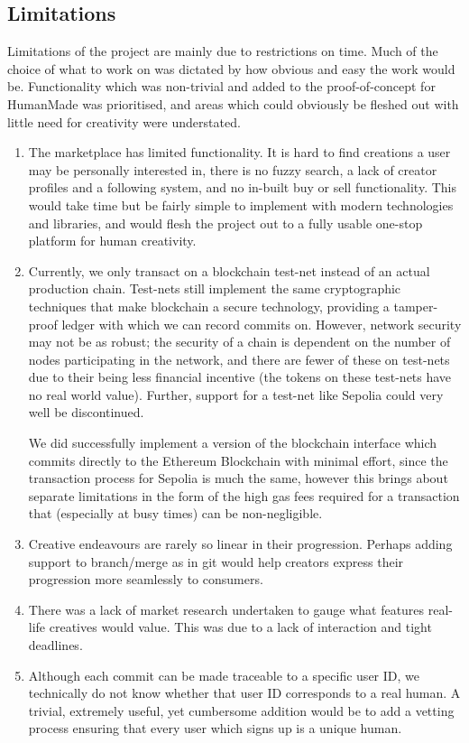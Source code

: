 \documentclass[12pt,a4paper]{article}
\begin{document}
\subsection{Limitations}
Limitations of the project are mainly due to restrictions on time. Much of the choice of what to work on was dictated by how obvious and easy the work would be. Functionality which was non-trivial and added to the proof-of-concept for HumanMade was prioritised, and areas which could obviously be fleshed out with little need for creativity were understated.
\begin{enumerate}
    \item The marketplace has limited functionality. It is hard to find creations a user may be personally interested in, there is no fuzzy search, a lack of creator profiles and a following system, and no in-built buy or sell functionality. This would take time but be fairly simple to implement with modern technologies and libraries, and would flesh the project out to a fully usable one-stop platform for human creativity.
    \item Currently, we only transact on a blockchain test-net instead of an actual production chain. Test-nets still implement the same cryptographic techniques that make blockchain a secure technology, providing a tamper-proof ledger with which we can record commits on. However, network security may not be as robust; the security of a chain is dependent on the number of nodes participating in the network, and there are fewer of these on test-nets due to their being less financial incentive (the tokens on these test-nets have no real world value). Further, support for a test-net like Sepolia could very well be discontinued.
    
    We did successfully implement a version of the blockchain interface which commits directly to the Ethereum Blockchain with minimal effort, since the transaction process for Sepolia is much the same, however this brings about separate limitations in the form of the high gas fees required for a transaction that (especially at busy times) can be non-negligible.
    \item Creative endeavours are rarely so linear in their progression. Perhaps adding support to branch/merge as in git would help creators express their progression more seamlessly to consumers.
    \item There was a lack of market research undertaken to gauge what features real-life creatives would value. This was due to a lack of interaction and tight deadlines.
    \item Although each commit can be made traceable to a specific user ID, we technically do not know whether that user ID corresponds to a real human. A trivial, extremely useful, yet cumbersome addition would be to add a vetting process ensuring that every user which signs up is a unique human. 
\end{enumerate}
\end{document}

